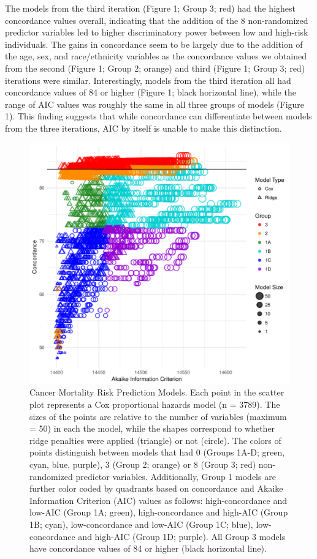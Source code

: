 \documentclass[12pt,oneside]{reedthesis}
\theoremstyle{definition}
\theoremstyle{definition}
\theoremstyle{definition}
\theoremstyle{remark}
\begin{document}
The models from the third iteration (Figure 1; Group 3; red) had the
highest concordance values overall, indicating that the addition of the
8 non-randomized predictor variables led to higher discriminatory power
between low and high-risk individuals. The gains in concordance seem to
be largely due to the addition of the age, sex, and race/ethnicity
variables as the concordance values we obtained from the second (Figure
1; Group 2; orange) and third (Figure 1; Group 3; red) iterations were
similar. Interestingly, models from the third iteration all had
concordance values of 84 or higher (Figure 1; black horizontal line),
while the range of AIC values was roughly the same in all three groups
of models (Figure 1). This finding suggests that while concordance can
differentiate between models from the three iterations, AIC by itself is
unable to make this distinction.
\begin{figure}
\centering
\includegraphics[width=\textwidth,height=0.6\textheight]{figure/1-quad-final.pdf}
\caption{Cancer Mortality Risk Prediction Models. \break Each point in
the scatter plot represents a Cox proportional hazards model (n = 3789).
The sizes of the points are relative to the number of variables (maximum
= 50) in each the model, while the shapes correspond to whether ridge
penalties were applied (triangle) or not (circle). The colors of points
distinguish between models that had 0 (Groups 1A-D; green, cyan, blue,
purple), 3 (Group 2; orange) or 8 (Group 3; red) non-randomized
predictor variables. Additionally, Group 1 models are further color
coded by quadrants based on concordance and Akaike Information Criterion
(AIC) values as follows: high-concordance and low-AIC (Group 1A; green),
high-concordance and high-AIC (Group 1B; cyan), low-concordance and
low-AIC (Group 1C; blue), low-concordance and high-AIC (Group 1D;
purple). All Group 3 models have concordance values of 84 or higher
(black horizontal line).}
\end{figure}
\end{document}
